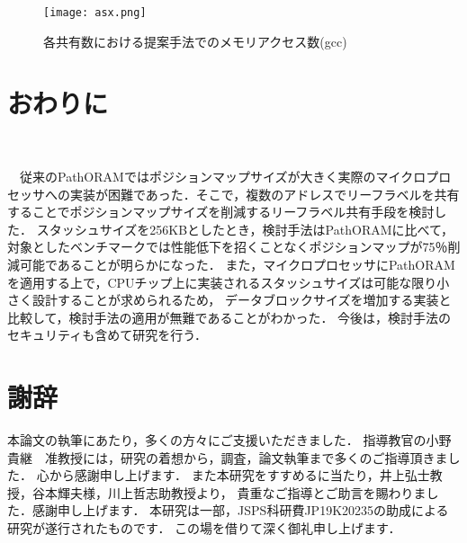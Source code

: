\documentclass{jarticle}
\begin{document}


\begin{figure}[t]
  \texttt{[image: asx.png]}
  \caption{各共有数における提案手法でのメモリアクセス数(gcc)}
  \label{gccres}
\end{figure}



\section{おわりに}




　従来のPathORAMではポジションマップサイズが大きく実際のマイクロプロセッサへの実装が困難であった．そこで，複数のアドレスでリーフラベルを共有することでポジションマップサイズを削減するリーフラベル共有手段を検討した．
スタッシュサイズを256KBとしたとき，検討手法はPathORAMに比べて，
対象としたベンチマークでは性能低下を招くことなくポジションマップが75％削減可能であることが明らかになった．
また，マイクロプロセッサにPathORAMを適用する上で，CPUチップ上に実装されるスタッシュサイズは可能な限り小さく設計することが求められるため，
データブロックサイズを増加する実装と比較して，検討手法の適用が無難であることがわかった．
今後は，検討手法のセキュリティも含めて研究を行う．

\section{謝辞}
本論文の執筆にあたり，多くの方々にご支援いただきました．
指導教官の小野貴継　准教授には，研究の着想から，調査，論文執筆まで多くのご指導頂きました．
心から感謝申し上げます．
また本研究をすすめるに当たり，井上弘士教授，谷本輝夫様，川上哲志助教授より，
貴重なご指導とご助言を賜わりました．感謝申し上げます．
本研究は一部，JSPS科研費JP19K20235の助成による研究が遂行されたものです．
この場を借りて深く御礼申し上げます．
\end{document}
